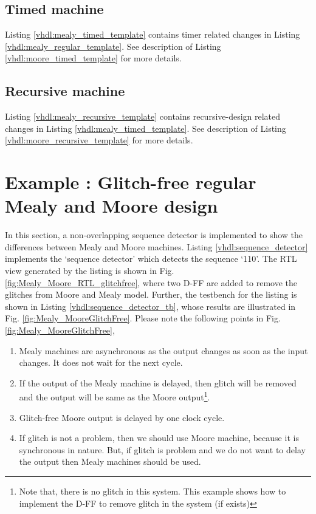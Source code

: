\subsection{Timed machine}
Listing \ref{vhdl:mealy_timed_template} contains timer related changes in Listing \ref{vhdl:mealy_regular_template}. See description of Listing \ref{vhdl:moore_timed_template} for more details. 




\subsection{Recursive machine}

Listing \ref{vhdl:mealy_recursive_template} contains recursive-design related changes in Listing \ref{vhdl:mealy_timed_template}. See description of Listing \ref{vhdl:moore_recursive_template} for more details. 



\section{Example : Glitch-free regular Mealy and Moore design} \label{sec:exampleRegularMMGlitchFree}
In this section, a non-overlapping sequence detector is implemented to show the differences between Mealy and Moore machines. Listing \ref{vhdl:sequence_detector} implements the `sequence detector' which detects the sequence `110'. The RTL view generated by the listing is shown in Fig. \ref{fig:Mealy_Moore_RTL_glitchfree}, where two D-FF are added to remove the glitches from Moore and Mealy model. Further, the testbench for the listing is shown in Listing \ref{vhdl:sequence_detector_tb}, whose results are illustrated in Fig. \ref{fig:Mealy_MooreGlitchFree}. Please note the following points in Fig. \ref{fig:Mealy_MooreGlitchFree},
\begin{enumerate}
	\item Mealy machines are asynchronous as the output changes as soon as the input changes. It does not wait for the next cycle. 
	\item If the output of the Mealy machine is delayed, then glitch will be removed and the output will be same as the Moore output\footnote{Note that, there is no glitch in this system. This example shows how to implement the D-FF to remove glitch in the system (if exists)}. 
	\item Glitch-free Moore output is delayed by one clock cycle. 
	\item If glitch is not a problem, then we should use Moore machine, because it is synchronous in nature. But, if glitch is problem and we do not want to delay the output then Mealy machines should be used. 
\end{enumerate}

